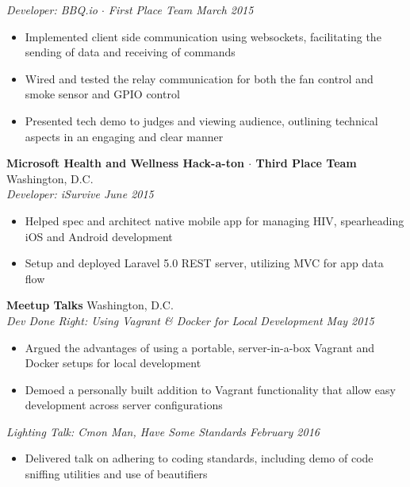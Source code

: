 \documentclass[10pt]{article}
\begin{document}
\textit{Developer: BBQ.io $\cdot$ First Place Team \hfill March 2015} \\
\vspace{-1.1em}
\begin{itemize}
  \item Implemented client side communication using websockets, facilitating the sending of data and receiving of commands
  \item Wired and tested the relay communication for both the fan control and smoke sensor and GPIO control
  \item Presented tech demo to judges and viewing audience, outlining technical aspects in an engaging and clear manner
\end{itemize}
\textbf{Microsoft Health and Wellness Hack-a-ton $\cdot$ Third Place Team} \hfill Washington, D.C. \\
\textit{Developer: iSurvive \hfill June 2015} \\
\vspace{-1.1em}
\begin{itemize}
  \item Helped spec and architect native mobile app for managing HIV, spearheading iOS and Android development
  \item Setup and deployed Laravel 5.0 REST server, utilizing MVC for app data flow
\end{itemize}
\textbf{Meetup Talks} \hfill Washington, D.C. \\
\textit{Dev Done Right: Using Vagrant \& Docker for Local Development \hfill May 2015} \\
\vspace{-1.1em}
\begin{itemize}
  \item Argued the advantages of using a portable, server-in-a-box Vagrant and Docker setups for local development
  \item Demoed a personally built addition to Vagrant functionality that allow easy development across server configurations
\end{itemize}
\textit{Lighting Talk: C\textquotesingle{}mon Man, Have Some Standards \hfill February 2016} \\
\vspace{-1.1em}
\begin{itemize}
  \item Delivered talk on adhering to coding standards, including demo of code sniffing utilities and use of beautifiers
\end{itemize}
\end{document}
